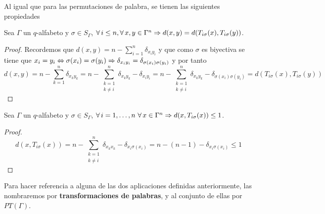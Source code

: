 Al igual que para las permutaciones de palabra, se tienen las siguientes propiedades

\begin{lemma}
	\label{res:transmutacion-igualdad-distancia}
	Sea $\Gamma$ un $q$-alfabeto y $\sigma\in S_\Gamma$, $\forall i\leq n, \forall x,y\in\Gamma^n\so d(x, y) = d(T_{i\sigma}(x), T_{i\sigma}(y))$.
\end{lemma}
\begin{proof}
	Recordemos que $d(x, y) = n-\sum_{i=1}^n \delta_{x_i y_i}$ y que como $\sigma$ es biyectiva se tiene que $x_i=y_i\Leftrightarrow \sigma(x_i) = \sigma(y_i)\Rightarrow \delta_{x_i y_i}=\delta_{\sigma(x_i) \sigma(y_i)}$ y por tanto
	\[
		d(x, y) = n-\sum_{k=1}^n \delta_{x_k y_k}=n-\sum_{\substack{k=1\\k\neq i}}^n \delta_{x_k y_k}-\delta_{x_i y_i}=n-\sum_{\substack{k=1\\k\neq i}}^n \delta_{x_k y_k}-\delta_{\sigma(x_i) \sigma(y_i)}=d(T_{i\sigma}(x), T_{i\sigma}(y))
	\]
\end{proof}

\begin{lemma}
	Sea $\Gamma$ un $q$-alfabeto y $\sigma\in S_\Gamma$, $\forall i=1,\dots,n\ \forall x\in\Gamma^n\so d(x, T_{i\sigma}(x))\leq 1$.
\end{lemma}
\begin{proof}
	\[
		d(x, T_{i\sigma}(x)) = n-\sum_{\substack{k=1\\k\neq i}}^n\delta_{x_k x_k}- \delta_{x_i \sigma(x_i)}=n-(n-1)-\delta_{x_i \sigma(x_i)}\leq 1
	\]
\end{proof}

Para hacer referencia a alguna de las dos aplicaciones definidas anteriormente, las nombraremos por \textbf{transformaciones de palabras}, y al conjunto de ellas por $PT(\Gamma)$.

